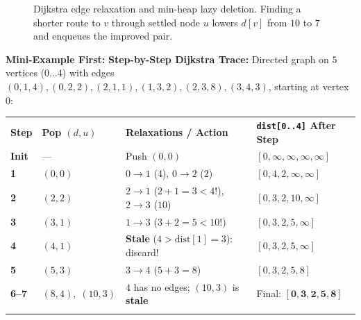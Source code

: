 \documentclass[11pt,a4paper]{article}
\theoremstyle{definition}
\newcommand{\examplebeat}{\textbf{\color{primaryblue}Mini-Example First:} }
\begin{document}
\begin{figure}[htbp]
\caption{Dijkstra edge relaxation and min-heap lazy deletion. Finding a shorter route to $v$ through settled node $u$ lowers $d[v]$ from $10$ to $7$ and enqueues the improved pair.}
\label{fig:graph-dijkstra-relax}
\end{figure}

\examplebeat \textbf{Step-by-Step Dijkstra Trace:} Directed graph on $5$ vertices ($0 \dots 4$) with edges $(0,1,4), (0,2,2), (2,1,1), (1,3,2), (2,3,8), (3,4,3)$, starting at vertex $0$:

\begin{center}
\begingroup\footnotesize{}
\begin{tabularx}{\textwidth}{>{\centering\arraybackslash\bfseries}p{1.0cm} >{\raggedright\arraybackslash}p{2.0cm} >{\raggedright\arraybackslash}X >{\raggedright\arraybackslash}p{3.9cm}}
\arrayrulecolor{primaryblue}\toprule[1.1pt]
\rowcolor{primaryblue!10}
\textcolor{primaryblue}{\textbf{Step}} & \textcolor{primaryblue}{\textbf{Pop $(d, u)$}} & \textcolor{primaryblue}{\textbf{Relaxations / Action}} & \textcolor{primaryblue}{\textbf{\texttt{dist[0..4]} After Step}} \\
\arrayrulecolor{codeframe}\midrule[0.6pt]
Init & --- & Push $(0, 0)$ & $[0, \infty, \infty, \infty, \infty]$ \\
1 & $(0, 0)$ & $0 \to 1$ ($4$), $0 \to 2$ ($2$) & $[0, 4, 2, \infty, \infty]$ \\
2 & $(2, 2)$ & $2 \to 1$ ($2+1=3 < 4$!), $2 \to 3$ ($10$) & $[0, 3, 2, 10, \infty]$ \\
3 & $(3, 1)$ & $1 \to 3$ ($3+2=5 < 10$!) & $[0, 3, 2, 5, \infty]$ \\
4 & $(4, 1)$ & \textbf{Stale} ($4 > \text{dist}[1] = 3$): discard! & $[0, 3, 2, 5, \infty]$ \\
5 & $(5, 3)$ & $3 \to 4$ ($5+3=8$) & $[0, 3, 2, 5, 8]$ \\
6--7 & $(8, 4),\; (10, 3)$ & $4$ has no edges; $(10, 3)$ is \textbf{stale} & Final: $\mathbf{[0, 3, 2, 5, 8]}$ \\
\arrayrulecolor{primaryblue}\bottomrule[1.1pt]
\end{tabularx}\endgroup
\end{center}
\end{document}
